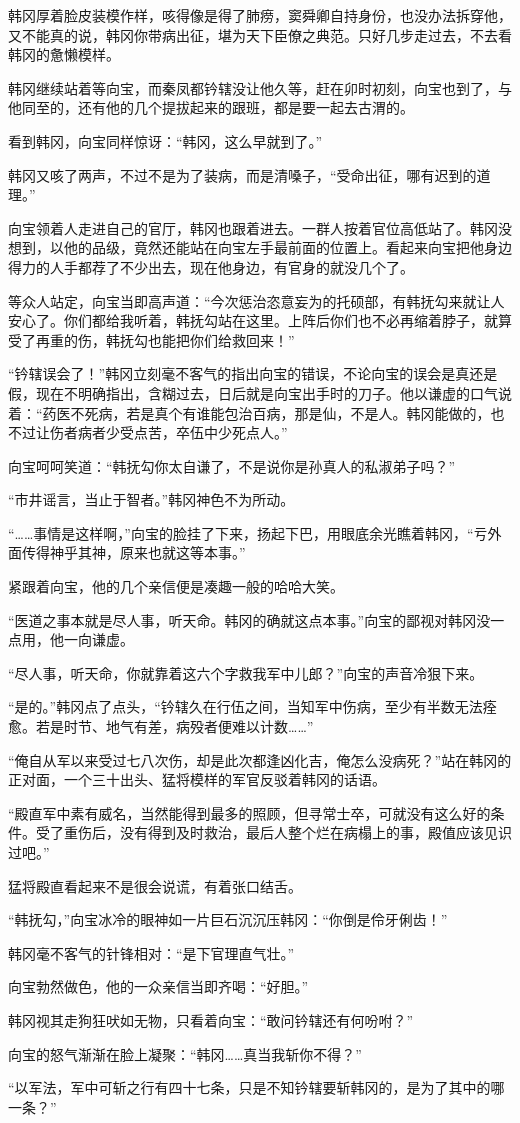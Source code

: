 韩冈厚着脸皮装模作样，咳得像是得了肺痨，窦舜卿自持身份，也没办法拆穿他，又不能真的说，韩冈你带病出征，堪为天下臣僚之典范。只好几步走过去，不去看韩冈的惫懒模样。

韩冈继续站着等向宝，而秦凤都钤辖没让他久等，赶在卯时初刻，向宝也到了，与他同至的，还有他的几个提拔起来的跟班，都是要一起去古渭的。

看到韩冈，向宝同样惊讶：“韩冈，这么早就到了。”

韩冈又咳了两声，不过不是为了装病，而是清嗓子，“受命出征，哪有迟到的道理。”

向宝领着人走进自己的官厅，韩冈也跟着进去。一群人按着官位高低站了。韩冈没想到，以他的品级，竟然还能站在向宝左手最前面的位置上。看起来向宝把他身边得力的人手都荐了不少出去，现在他身边，有官身的就没几个了。

等众人站定，向宝当即高声道：“今次惩治恣意妄为的托硕部，有韩抚勾来就让人安心了。你们都给我听着，韩抚勾站在这里。上阵后你们也不必再缩着脖子，就算受了再重的伤，韩抚勾也能把你们给救回来！”

“钤辖误会了！”韩冈立刻毫不客气的指出向宝的错误，不论向宝的误会是真还是假，现在不明确指出，含糊过去，日后就是向宝出手时的刀子。他以谦虚的口气说着：“药医不死病，若是真个有谁能包治百病，那是仙，不是人。韩冈能做的，也不过让伤者病者少受点苦，卒伍中少死点人。”

向宝呵呵笑道：“韩抚勾你太自谦了，不是说你是孙真人的私淑弟子吗？”

“市井谣言，当止于智者。”韩冈神色不为所动。

“……事情是这样啊，”向宝的脸挂了下来，扬起下巴，用眼底余光瞧着韩冈，“亏外面传得神乎其神，原来也就这等本事。”

紧跟着向宝，他的几个亲信便是凑趣一般的哈哈大笑。

“医道之事本就是尽人事，听天命。韩冈的确就这点本事。”向宝的鄙视对韩冈没一点用，他一向谦虚。

“尽人事，听天命，你就靠着这六个字救我军中儿郎？”向宝的声音冷狠下来。

“是的。”韩冈点了点头，“钤辖久在行伍之间，当知军中伤病，至少有半数无法痊愈。若是时节、地气有差，病殁者便难以计数……”

“俺自从军以来受过七八次伤，却是此次都逢凶化吉，俺怎么没病死？”站在韩冈的正对面，一个三十出头、猛将模样的军官反驳着韩冈的话语。

“殿直军中素有威名，当然能得到最多的照顾，但寻常士卒，可就没有这么好的条件。受了重伤后，没有得到及时救治，最后人整个烂在病榻上的事，殿值应该见识过吧。”

猛将殿直看起来不是很会说谎，有着张口结舌。

“韩抚勾，”向宝冰冷的眼神如一片巨石沉沉压韩冈：“你倒是伶牙俐齿！”

韩冈毫不客气的针锋相对：“是下官理直气壮。”

向宝勃然做色，他的一众亲信当即齐喝：“好胆。”

韩冈视其走狗狂吠如无物，只看着向宝：“敢问钤辖还有何吩咐？”

向宝的怒气渐渐在脸上凝聚：“韩冈……真当我斩你不得？”

“以军法，军中可斩之行有四十七条，只是不知钤辖要斩韩冈的，是为了其中的哪一条？”

